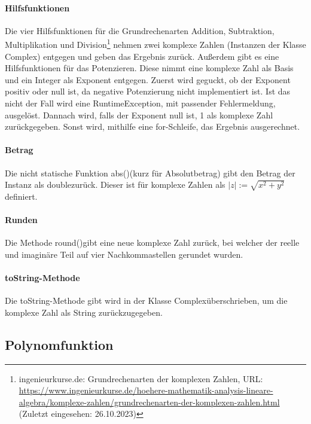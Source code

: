 \documentclass[12pt]{article}
\begin{document}
\paragraph{Hilfsfunktionen}
Die vier Hilfsfunktionen für die Grundrechenarten Addition, Subtraktion, Multiplikation und Division\footnote{ingenieurkurse.de: Grundrechenarten der komplexen Zahlen, URL: \url{https://www.ingenieurkurse.de/hoehere-mathematik-analysis-lineare-algebra/komplexe-zahlen/grundrechenarten-der-komplexen-zahlen.html} (Zuletzt eingesehen: 26.10.2023)\label{ftn:grundrechenarten}} nehmen zwei komplexe Zahlen (Instanzen der Klasse \glqq Complex\grqq) entgegen und geben das Ergebnis zurück. 
Außerdem gibt es eine Hilfsfunktionen für das Potenzieren. Diese nimmt eine komplexe Zahl als Basis und ein Integer als Exponent entgegen. Zuerst wird geguckt, ob der Exponent positiv oder null ist, da negative Potenzierung nicht implementiert ist. Ist das nicht der Fall wird eine \glqq RuntimeException\grqq, mit passender Fehlermeldung, ausgelöst. Dannach wird, falls der Exponent null ist, 1 als komplexe Zahl zurückgegeben. Sonst wird, mithilfe eine \glqq for-Schleife\grqq, das Ergebnis ausgerechnet.

\paragraph{Betrag}
Die nicht statische Funktion \glqq abs()\grqq\space (kurz für Absolutbetrag) gibt den Betrag der Instanz als \glqq double\grqq\space zurück. Dieser ist für komplexe Zahlen als $|z| := \sqrt{x^2+y^2}$ definiert.

\paragraph{Runden}
Die Methode \glqq round()\grqq\space gibt eine neue komplexe Zahl zurück, bei welcher der reelle und imaginäre Teil auf vier Nachkommastellen gerundet wurden.

\paragraph{\glqq toString\grqq-Methode}
Die \glqq toString\grqq-Methode gibt wird in der Klasse \glqq Complex\grqq\space überschrieben, um die komplexe Zahl als String zurückzugegeben.

\subsection{Polynomfunktion}
\end{document}
